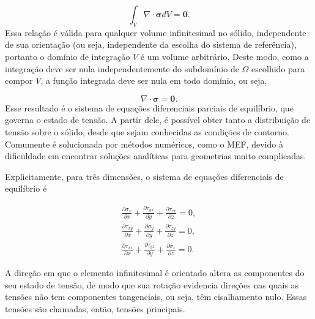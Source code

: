 \begin{equation}
    \int_V \nabla \cdot \bm{\sigma} dV = \bm{0}.
\end{equation}
Essa relação é válida para qualquer volume infinitesimal no sólido, independente de sua orientação (ou seja, independente da escolha do sistema de referência), portanto o domínio de integração $V$ é um volume arbitrário. Deste modo, como a integração deve ser nula independentemente do subdomínio de $\Omega$ escolhido para compor $V$, a função integrada deve ser nula em todo domínio, ou seja,

\begin{equation}
    \nabla \cdot \bm{\sigma} = \bm{0}.
\end{equation}
Esse resultado é o sistema de equações diferenciais parciais de equilíbrio, que governa o estado de tensão. A partir dele, é possível obter tanto a distribuição de tensão sobre o sólido, desde que sejam conhecidas as condições de contorno. Comumente é solucionada por métodos numéricos, como o MEF, devido à dificuldade em encontrar soluções analíticas para geometrias muito complicadas. 

Explicitamente, para três dimensões, o sistema de equações diferenciais de equilíbrio é

\begin{gather}
       \displaystyle \frac{\partial \sigma_x}{\partial x} + \frac{\partial \tau_{yx}}{\partial y} + \frac{\partial \tau_{zx}}{\partial z} = 0, \\
       \displaystyle \frac{\partial \tau_{xy}}{\partial x} + \frac{\partial \sigma_y}{\partial y} + \frac{\partial \tau_{zy}}{\partial z} = 0, \\
       \displaystyle \frac{\partial \tau_{xz}}{\partial x} + \frac{\partial \tau_{yz}}{\partial y} + \frac{\partial \sigma_z}{\partial z} = 0.
       \label{eq:equilibrio_governo}
\end{gather}


A direção em que o elemento infinitesimal é orientado altera as componentes do seu estado de tensão, de modo que sua rotação evidencia direções nas quais as tensões não tem componentes tangenciais, ou seja, têm cisalhamento nulo. Essas tensões são chamadas, então, tensões principais.


